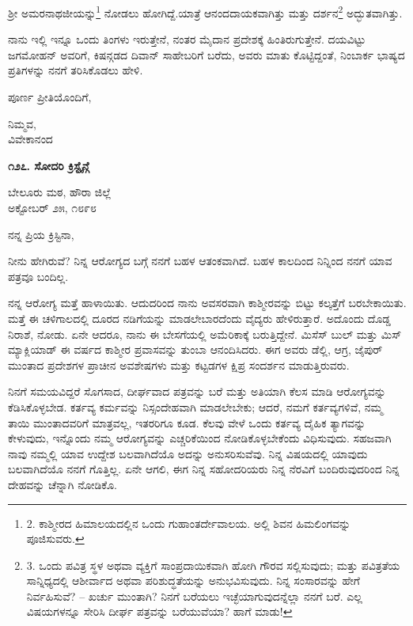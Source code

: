 ಶ‍್ರೀ ಅಮರನಾಥಜೀಯನ್ನು\footnote{2. ಕಾಶ್ಮೀರದ ಹಿಮಾಲಯದಲ್ಲಿನ ಒಂದು ಗುಹಾಂತರ್ದೇವಾಲಯ. ಅಲ್ಲಿ ಶಿವನ ಹಿಮಲಿಂಗವನ್ನು ಪೂಜಿಸುವರು.} ನೋಡಲು ಹೋಗಿದ್ದೆ.ಯಾತ್ರೆ ಆನಂದದಾಯಕವಾಗಿತ್ತು ಮತ್ತು ದರ್ಶನ\footnote{3. ಒಂದು ಪವಿತ್ರ ಸ್ಥಳ ಅಥವಾ ವ್ಯಕ್ತಿಗೆ ಸಾಂಪ್ರದಾಯಿಕವಾಗಿ ಹೋಗಿ ಗೌರವ ಸಲ್ಲಿಸುವುದು; ಮತ್ತು ಪವಿತ್ರತೆಯ ಸಾನ್ನಿಧ್ಯದಲ್ಲಿ ಆಶೀರ್ವಾದ ಅಥವಾ ಪರಿಶುದ್ಧತೆಯನ್ನು ಅನುಭವಿಸುವುದು. ನಿನ್ನ ಸಂಸಾರವನ್ನು ಹೇಗೆ ನಿರ್ವಹಿಸುವೆ? – ಖರ್ಚು ಮುಂತಾಗಿ? ನಿನಗೆ ಬರೆಯಲು ಇಚ್ಛೆಯಾಗುವುದನ್ನೆಲ್ಲಾ ನನಗೆ ಬರೆ. ಎಲ್ಲ ವಿಷಯಗಳನ್ನೂ ಸೇರಿಸಿ ದೀರ್ಘ ಪತ್ರವನ್ನು ಬರೆಯುವೆಯಾ? ಹಾಗೆ ಮಾಡು!} ಅದ್ಭುತವಾಗಿತ್ತು.

ನಾನು ಇಲ್ಲಿ ಇನ್ನೂ ಒಂದು ತಿಂಗಳು ಇರುತ್ತೇನೆ, ನಂತರ ಮೈದಾನ ಪ್ರದೇಶಕ್ಕೆ ಹಿಂತಿರುಗುತ್ತೇನೆ. ದಯವಿಟ್ಟು ಜಗಮೋಹನ್ ಅವರಿಗೆ, ಕಿಷನ್ಗಡದ ದಿವಾನ್ ಸಾಹೇಬರಿಗೆ ಬರೆದು, ಅವರು ಮಾತು ಕೊಟ್ಟಿದ್ದಂತೆ, ನಿಂಬಾರ್ಕ ಭಾಷ್ಯದ ಪ್ರತಿಗಳನ್ನು ನನಗೆ ತರಿಸಿಕೊಡಲು ಹೇಳಿ.

ಪೂರ್ಣ ಪ್ರೀತಿಯೊಂದಿಗೆ,

\begin{flushright}
ನಿಮ್ಮವ,\\ವಿವೇಕಾನಂದ
\end{flushright}

\begin{center}
\textbf{೧೨೭. ಸೋದರಿ ಕ್ರಿಸ್ಟೈನ್ಗೆ}
\end{center}

\begin{flushright}
ಬೇಲೂರು ಮಠ, ಹೌರಾ ಜಿಲ್ಲೆ\\ಅಕ್ಟೋಬರ್ ೨೫, ೧೮೯೮
\end{flushright}

ನನ್ನ ಪ್ರಿಯ ಕ್ರಿಸ್ಟಿನಾ,

ನೀನು ಹೇಗಿರುವೆ? ನಿನ್ನ ಆರೋಗ್ಯದ ಬಗ್ಗೆ ನನಗೆ ಬಹಳ ಆತಂಕವಾಗಿದೆ. ಬಹಳ ಕಾಲದಿಂದ ನಿನ್ನಿಂದ ನನಗೆ ಯಾವ ಪತ್ರವೂ ಬಂದಿಲ್ಲ.

ನನ್ನ ಆರೋಗ್ಯ ಮತ್ತೆ ಹಾಳಾಯಿತು. ಆದುದರಿಂದ ನಾನು ಅವಸರವಾಗಿ ಕಾಶ್ಮೀರವನ್ನು ಬಿಟ್ಟು ಕಲ್ಕತ್ತೆಗೆ ಬರಬೇಕಾಯಿತು. ಮತ್ತೆ ಈ ಚಳಿಗಾಲದಲ್ಲಿ ದೂರದ ನಡಿಗೆಯನ್ನು ಮಾಡಲೇಬಾರದೆಂದು ವೈದ್ಯರು ಹೇಳಿರುತ್ತಾರೆ. ಅದೊಂದು ದೊಡ್ಡ ನಿರಾಶೆ, ನೋಡು. ಏನೇ ಆದರೂ, ನಾನು ಈ ಬೇಸಗೆಯಲ್ಲಿ ಅಮೆರಿಕಾಕ್ಕೆ ಬರುತ್ತಿದ್ದೇನೆ. ಮಿಸೆಸ್ ಬುಲ್ ಮತ್ತು ಮಿಸ್ ಮ್ಯಾಕ್ಲಿಯಾಡ್ ಈ ವರ್ಷದ ಕಾಶ್ಮೀರ ಪ್ರವಾಸವನ್ನು ತುಂಬಾ ಆನಂದಿಸಿದರು. ಈಗ ಅವರು ಡೆಲ್ಲಿ, ಆಗ್ರ, ಜೈಪುರ್ ಮುಂತಾದ ಪ್ರದೇಶಗಳ ಪ್ರಾಚೀನ ಅವಶೇಷಗಳು ಮತ್ತು ಕಟ್ಟಡಗಳ ಕ್ಷಿಪ್ರ ಸಂದರ್ಶನ ಮಾಡುತ್ತಿರುವರು.

ನಿನಗೆ ಸಮಯವಿದ್ದರೆ ಸೊಗಸಾದ, ದೀರ್ಘವಾದ ಪತ್ರವನ್ನು ಬರೆ ಮತ್ತು ಅತಿಯಾಗಿ ಕೆಲಸ ಮಾಡಿ ಆರೋಗ್ಯವನ್ನು ಕೆಡಿಸಿಕೊಳ್ಳಬೇಡ. ಕರ್ತವ್ಯ ಕರ್ಮವನ್ನು ನಿಸ್ಸಂದೇಹವಾಗಿ ಮಾಡಲೇಬೇಕು; ಆದರೆ, ನಮಗೆ ಕರ್ತವ್ಯಗಳಿವೆ, ನಮ್ಮ ತಾಯಿ ಮುಂತಾದವರಿಗೆ ಮಾತ್ರವಲ್ಲ, ಇತರರಿಗೂ ಕೂಡ. ಕೆಲವು ವೇಳೆ ಒಂದು ಕರ್ತವ್ಯ ದೈಹಿಕ ತ್ಯಾಗವನ್ನು ಕೇಳುವುದು, ಇನ್ನೊಂದು ನಮ್ಮ ಆರೋಗ್ಯವನ್ನು ಎಚ್ಚರಿಕೆಯಿಂದ ನೋಡಿಕೊಳ್ಳಬೇಕೆಂದು ವಿಧಿಸುವುದು. ಸಹಜವಾಗಿ ನಾವು ನಮ್ಮಲ್ಲಿ ಯಾವ ಉದ್ದೇಶ ಬಲವಾಗಿದೆಯೊ ಅದನ್ನು ಅನುಸರಿಸುವೆವು. ನಿನ್ನ ವಿಷಯದಲ್ಲಿ ಯಾವುದು ಬಲವಾಗಿದೆಯೊ ನನಗೆ ಗೊತ್ತಿಲ್ಲ. ಏನೇ ಆಗಲಿ, ಈಗ ನಿನ್ನ ಸಹೋದರಿಯರು ನಿನ್ನ ನೆರವಿಗೆ ಬಂದಿರುವುದರಿಂದ ನಿನ್ನ ದೇಹವನ್ನು ಚೆನ್ನಾಗಿ ನೋಡಿಕೊ.

